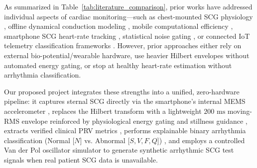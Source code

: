 As summarized in Table~\ref{tab:literature_comparison}, prior works have addressed individual aspects of cardiac monitoring---such as chest-mounted SCG physiology \cite{inan2015ballistocardiography}, offline dynamical conduction modeling \cite{quiroz2018cardiac}, mobile computational efficiency \cite{tsamis2017soft}, smartphone SCG heart-rate tracking \cite{tadi2016realtime}, statistical noise gating \cite{aliev2012monitoring}, or connected IoT telemetry classification frameworks \cite{pandian2026internet}. However, prior approaches either rely on external bio-potential/wearable hardware, use heavier Hilbert envelopes without automated energy gating, or stop at healthy heart-rate estimation without arrhythmia classification.

Our proposed project integrates these strengths into a unified, zero-hardware pipeline: it captures sternal SCG directly via the smartphone's internal MEMS accelerometer \cite{inan2015ballistocardiography, tadi2016realtime}, replaces the Hilbert transform with a lightweight $200\text{ ms}$ moving-RMS envelope reinforced by physiological energy gating and stillness guidance \cite{aliev2012monitoring}, extracts verified clinical PRV metrics \cite{taskforce1996heart}, performs explainable binary arrhythmia classification (Normal [$N$] vs. Abnormal [$S, V, F, Q$]) \cite{pandian2026internet}, and employs a controlled Van der Pol oscillator simulator \cite{vanderpol1928, quiroz2018cardiac} to generate synthetic arrhythmic SCG test signals when real patient SCG data is unavailable.
